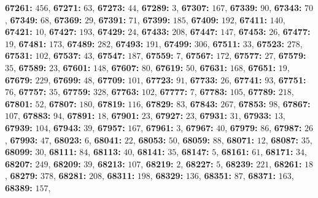 \textsf{\bfseries 67261:} $456$, \textsf{\bfseries 67271:} $63$, \textsf{\bfseries 67273:} $44$, \textsf{\bfseries 67289:} $3$, \textsf{\bfseries 67307:} $167$, \textsf{\bfseries 67339:} $90$, \textsf{\bfseries 67343:} $70$, \textsf{\bfseries 67349:} $68$, \textsf{\bfseries 67369:} $29$, \textsf{\bfseries 67391:} $71$, \textsf{\bfseries 67399:} $185$, \textsf{\bfseries 67409:} $192$, \textsf{\bfseries 67411:} $140$, \textsf{\bfseries 67421:} $10$, \textsf{\bfseries 67427:} $193$, \textsf{\bfseries 67429:} $24$, \textsf{\bfseries 67433:} $208$, \textsf{\bfseries 67447:} $147$, \textsf{\bfseries 67453:} $26$, \textsf{\bfseries 67477:} $19$, \textsf{\bfseries 67481:} $173$, \textsf{\bfseries 67489:} $282$, \textsf{\bfseries 67493:} $191$, \textsf{\bfseries 67499:} $306$, \textsf{\bfseries 67511:} $33$, \textsf{\bfseries 67523:} $278$, \textsf{\bfseries 67531:} $102$, \textsf{\bfseries 67537:} $43$, \textsf{\bfseries 67547:} $187$, \textsf{\bfseries 67559:} $7$, \textsf{\bfseries 67567:} $172$, \textsf{\bfseries 67577:} $27$, \textsf{\bfseries 67579:} $35$, \textsf{\bfseries 67589:} $23$, \textsf{\bfseries 67601:} $148$, \textsf{\bfseries 67607:} $80$, \textsf{\bfseries 67619:} $50$, \textsf{\bfseries 67631:} $168$, \textsf{\bfseries 67651:} $19$, \textsf{\bfseries 67679:} $229$, \textsf{\bfseries 67699:} $48$, \textsf{\bfseries 67709:} $101$, \textsf{\bfseries 67723:} $91$, \textsf{\bfseries 67733:} $26$, \textsf{\bfseries 67741:} $93$, \textsf{\bfseries 67751:} $76$, \textsf{\bfseries 67757:} $35$, \textsf{\bfseries 67759:} $328$, \textsf{\bfseries 67763:} $102$, \textsf{\bfseries 67777:} $7$, \textsf{\bfseries 67783:} $105$, \textsf{\bfseries 67789:} $218$, \textsf{\bfseries 67801:} $52$, \textsf{\bfseries 67807:} $180$, \textsf{\bfseries 67819:} $116$, \textsf{\bfseries 67829:} $83$, \textsf{\bfseries 67843:} $267$, \textsf{\bfseries 67853:} $98$, \textsf{\bfseries 67867:} $107$, \textsf{\bfseries 67883:} $94$, \textsf{\bfseries 67891:} $18$, \textsf{\bfseries 67901:} $23$, \textsf{\bfseries 67927:} $23$, \textsf{\bfseries 67931:} $31$, \textsf{\bfseries 67933:} $13$, \textsf{\bfseries 67939:} $104$, \textsf{\bfseries 67943:} $39$, \textsf{\bfseries 67957:} $167$, \textsf{\bfseries 67961:} $3$, \textsf{\bfseries 67967:} $40$, \textsf{\bfseries 67979:} $86$, \textsf{\bfseries 67987:} $26$, \textsf{\bfseries 67993:} $47$, \textsf{\bfseries 68023:} $6$, \textsf{\bfseries 68041:} $22$, \textsf{\bfseries 68053:} $50$, \textsf{\bfseries 68059:} $88$, \textsf{\bfseries 68071:} $12$, \textsf{\bfseries 68087:} $35$, \textsf{\bfseries 68099:} $30$, \textsf{\bfseries 68111:} $84$, \textsf{\bfseries 68113:} $40$, \textsf{\bfseries 68141:} $35$, \textsf{\bfseries 68147:} $5$, \textsf{\bfseries 68161:} $61$, \textsf{\bfseries 68171:} $34$, \textsf{\bfseries 68207:} $249$, \textsf{\bfseries 68209:} $39$, \textsf{\bfseries 68213:} $107$, \textsf{\bfseries 68219:} $2$, \textsf{\bfseries 68227:} $5$, \textsf{\bfseries 68239:} $221$, \textsf{\bfseries 68261:} $18$, \textsf{\bfseries 68279:} $378$, \textsf{\bfseries 68281:} $208$, \textsf{\bfseries 68311:} $198$, \textsf{\bfseries 68329:} $136$, \textsf{\bfseries 68351:} $87$, \textsf{\bfseries 68371:} $163$, \textsf{\bfseries 68389:} $157$, 
